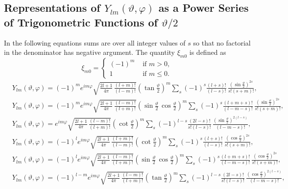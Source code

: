 \subsection{Representations of $Y_{l m}(\vartheta, \varphi)$ as a Power Series of Trigonometric Functions of $\vartheta / 2$}\label{sec:5.2.2}
In the following equations sums are over all integer values of $s$ so that no factorial in the denominator has negative argument. The quantity $\xi_{m 0}$ is defined as
\begin{equation}
\xi_{m 0}= \begin{cases}(-1)^{m} & \text { if } m>0 ,\\ 1 & \text { if } m \leq 0.\end{cases} \label{eq:5:2:8}
\end{equation}
\begin{align}
& Y_{l m}(\vartheta, \varphi)=(-1)^{m} e^{i m \varphi} \sqrt{\frac{2 l+1}{4 \pi} \, \frac{(l+m)!}{(l-m)!}}\left(\tan \frac{\vartheta}{2}\right)^{m} \sum_{s}(-1)^{s} \frac{(l+s)!}{(l-s)!} \, \frac{\left(\sin \frac{\vartheta}{2}\right)^{2 s}}{s!(s+m)!} , \label{eq:5:2:9}\\
& Y_{l m}(\vartheta, \varphi)=(-1)^{m} e^{i m \varphi} \sqrt{\frac{2 l+1}{4 \pi} \, \frac{(l-m)!}{(l+m)!}}\left(\sin \frac{\vartheta}{2} \, \cos \frac{\vartheta}{2}\right)^{m} \sum_{s}(-1)^{s} \frac{(l+m+s)!}{(l-m-s)!} \, \frac{\left(\sin \frac{\vartheta}{2}\right)^{2 s}}{s!(s+m)!} , \label{eq:5:2:10}\\
& Y_{l m}(\vartheta, \varphi)=e^{i m \varphi} \sqrt{\frac{2 l+1}{4 \pi} \, \frac{(l-m)!}{(l+m)!}}\left(\cot \frac{\vartheta}{2}\right)^{m} \sum_{s}(-1)^{l-s} \frac{(2 l-s)!}{s!(l-s)!} \, \frac{\left(\sin \frac{\vartheta}{2}\right)^{2(l-s)}}{(l-m-s)!} ,\label{eq:5:2:11}
\end{align}
\begin{align}
&Y_{l m}(\vartheta, \varphi)=(-1)^{l} e^{i m \varphi} \sqrt{\frac{2 l+1}{4 \pi} \, \frac{(l+m)!}{(l-m)!}}\left(\cot \frac{\vartheta}{2}\right)^{m} \sum_{s}(-1)^{s} \frac{(l+s)!}{(l-s)!} \, \frac{\left(\cos \frac{\vartheta}{2}\right)^{2 s}}{s!(s+m)!},  \label{eq:5:2:12}\\
&Y_{l m}(\vartheta, \varphi)=(-1)^{l} e^{i m \varphi} \sqrt{\frac{2 l+1}{4 \pi} \, \frac{(l-m)!}{(l+m)!}}\left(\sin \frac{\vartheta}{2} \, \cos \frac{\vartheta}{2}\right)^{m} \sum_{s}(-1)^{s} \frac{(l+m+s)!}{(l-m-s)!} \, \frac{\left(\cos \frac{\vartheta}{2}\right)^{2 s}}{s!(s+m)!},  \label{eq:5:2:13}\\
&Y_{l m}(\vartheta, \varphi)=(-1)^{l-m} e^{i m \varphi} \sqrt{\frac{2 l+1}{4 \pi} \, \frac{(l-m)!}{(l+m)!}}\left(\tan \frac{\vartheta}{2}\right)^{m} \sum_{s}(-1)^{l-s} \frac{(2 l-s)!}{s!(l-s)!} \, \frac{\left(\cos \frac{\vartheta}{2}\right)^{2(l-s)}}{(l-m-s)!},  \label{eq:5:2:14}
\end{align}
